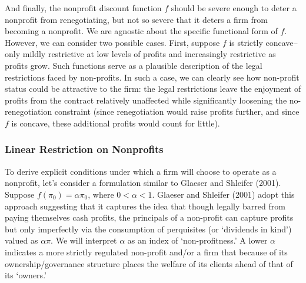 \documentclass[11pt]{article}%
\providecommand{\DIFdel}[1]{{\protect\color{red} \scriptsize #1}} %
\begin{document}
\DIFdel{And finally, the nonprofit discount function $f$ should be severe enough to
deter a nonprofit from renegotiating, but not so severe that it deters a
firm from becoming a nonprofit. We are agnostic about the specific
functional form of $f$. However, we can consider two possible cases. First,
suppose $f$ is strictly concave--only mildly restrictive at low levels of
profits and increasingly restrictive as profits grow. Such functions serve
as a plausible description of the legal restrictions faced by non-profits.
In such  a case, we can clearly see how non-profit status could be attractive
to the firm: the legal restrictions leave the enjoyment of profits from the
contract relatively unaffected while significantly loosening the
no-renegotiation constraint (since renegotiation would raise profits
further, and since $f$ is concave, these additional profits would count for
little).
}%

\subsubsection{\DIFdel{Linear Restriction on Nonprofits}}
\addtocounter{subsubsection}{-1}%

\DIFdel{To derive explicit conditions under which a firm will choose to operate as a
nonprofit, let's consider a formulation similar to Glaeser and Shleifer
(2001). Suppose $f\left( \pi _{0}\right) =\alpha \pi _{0}$, where $0<\alpha
<1$. Glaeser and Shleifer (2001) adopt this approach suggesting that it
captures the idea that though legally barred from paying themselves cash
profits, the principals of a non-profit can capture profits but only imperfectly via the consumption of perquisites}%
\DIFdel{(or `dividends in kind')
valued as $\alpha \pi .$ We will interpret $\alpha $ as an index of
`non-profitness.' }%
\DIFdel{A lower $\alpha $ indicates a more strictly regulated
non-profit and/or a firm that because of its ownership/governance structure
places the welfare of its clients ahead of that of its `owners.'
}%
\end{document}
